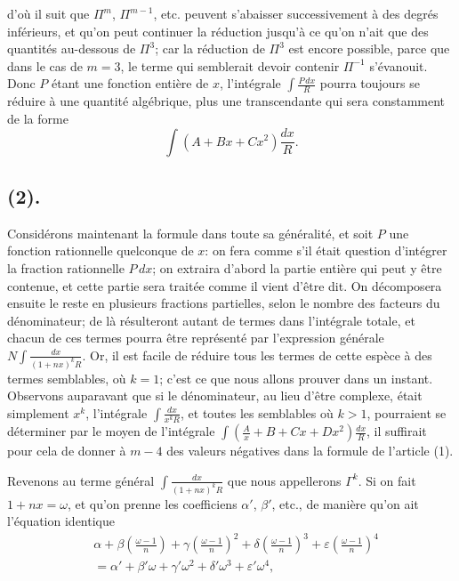 \documentclass{article}
\begin{document}
d'où il suit que $\Pi^{m}$, $\Pi^{m-1}$, etc. peuvent s'abaisser successivement à des degrés inférieurs, et qu'on peut continuer la réduction jusqu'à ce qu'on n'ait que des quantités au-dessous de $\Pi^{3}$; car la réduction de $\Pi^{3}$ est encore possible, parce que dans le cas de $m=3$, le terme qui semblerait devoir contenir $\Pi^{-1}$ s'évanouit. Donc $P$ étant une fonction entière de $x$, l'intégrale $\displaystyle\int\frac{P\,dx}{R}$ pourra toujours se réduire à une quantité algébrique, plus une transcendante qui sera constamment de la forme
\[ \int(A+Bx+Cx^{2})\frac{dx}{R}. \]

\subsection*{(2).}

Considérons maintenant la formule dans toute sa généralité, et soit $P$ une fonction rationnelle quelconque de $x$: on fera comme s'il était question d'intégrer la fraction rationnelle $P\,dx$; on extraira d'abord la partie entière qui peut y être contenue, et cette partie sera traitée comme il vient d'être dit. On décomposera ensuite le reste en plusieurs fractions partielles, selon le nombre des facteurs du dénominateur; de là résulteront autant de termes dans l'intégrale totale, et chacun de ces termes pourra être représenté par l'expression générale $\displaystyle N\int\frac{dx}{(1+nx)^{k}R}$. Or, il est facile de réduire tous les termes de cette espèce à des termes semblables, où $k=1$; c'est ce que nous allons prouver dans un instant. Observons auparavant que si le dénominateur, au lieu d'être complexe, était simplement $x^{k}$, l'intégrale $\displaystyle\int\frac{dx}{x^{k}R}$, et toutes les semblables où $k>1$, pourraient se déterminer par le moyen de l'intégrale $\displaystyle\int\left(\frac{A}{x}+B+Cx+Dx^{2}\right)\frac{dx}{R}$, il suffirait pour cela de donner à $m-4$ des valeurs négatives dans la formule de l'article (1).

Revenons au terme général $\displaystyle\int\frac{dx}{(1+nx)^{k}R}$ que nous appellerons $\Gamma^{k}$. Si on fait $1+nx=\omega$, et qu'on prenne les coefficiens $\alpha'$, $\beta'$, etc., de manière qu'on ait l'équation identique
\[ \begin{aligned} &\alpha+\beta\left(\frac{\omega-1}{n}\right)+\gamma\left(\frac{\omega-1}{n}\right)^{2}+\delta\left(\frac{\omega-1}{n}\right)^{3}+\varepsilon\left(\frac{\omega-1}{n}\right)^{4}\\ &=\alpha'+\beta'\omega+\gamma'\omega^{2}+\delta'\omega^{3}+\varepsilon'\omega^{4}, \end{aligned} \]
\end{document}
